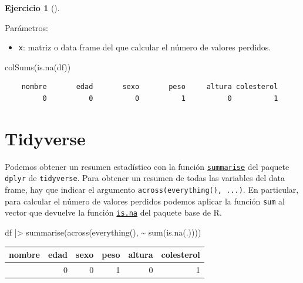 \documentclass[
  a4paper,
]{scrreport}
\newenvironment{Shaded}{\begin{snugshade}}{\end{snugshade}}
\newcommand{\FunctionTok}[1]{\textcolor[rgb]{0.28,0.35,0.67}{#1}}
\newcommand{\NormalTok}[1]{\textcolor[rgb]{0.00,0.23,0.31}{#1}}
\newcommand{\SpecialCharTok}[1]{\textcolor[rgb]{0.37,0.37,0.37}{#1}}
\providecommand{\tightlist}{%
  \setlength{\itemsep}{0pt}\setlength{\parskip}{0pt}}\usepackage{longtable,booktabs,array}
\theoremstyle{definition}
\newtheorem{exercise}{Ejercicio}[chapter]
\theoremstyle{remark}
\begin{document}
\begin{exercise}[]
\begin{enumerate}
\begin{tcolorbox}
  Parámetros:

  \begin{itemize}
  \tightlist
  \item
    \texttt{x}: matriz o data frame del que calcular el número de
    valores perdidos.
  \end{itemize}

\begin{Shaded}
\begin{Highlighting}[]
\FunctionTok{colSums}\NormalTok{(}\FunctionTok{is.na}\NormalTok{(df))}
\end{Highlighting}
\end{Shaded}

\begin{verbatim}
    nombre       edad       sexo       peso     altura colesterol 
         0          0          0          1          0          1 
\end{verbatim}

  \section{Tidyverse}

  Podemos obtener un resumen estadístico con la función
  \href{https://dplyr.tidyverse.org/reference/summarise.html}{\texttt{summarise}}
  del paquete \texttt{dplyr} de \texttt{tidyverse}. Para obtener un
  resumen de todas las variables del data frame, hay que indicar el
  argumento \texttt{across(everything(),\ ...)}. En particular, para
  calcular el número de valores perdidos podemos aplicar la función
  \texttt{sum} al vector que devuelve la función
  \href{https://www.rdocumentation.org/packages/base/versions/3.6.2/topics/is.na}{\texttt{is.na}}
  del paquete base de R.

\begin{Shaded}
\begin{Highlighting}[]
\NormalTok{df }\SpecialCharTok{|\textgreater{}} \FunctionTok{summarise}\NormalTok{(}\FunctionTok{across}\NormalTok{(}\FunctionTok{everything}\NormalTok{(), }\SpecialCharTok{\textasciitilde{}} \FunctionTok{sum}\NormalTok{(}\FunctionTok{is.na}\NormalTok{(.))))}
\end{Highlighting}
\end{Shaded}

  \begin{longtable}[]{@{}rrrrrr@{}}
  \toprule\noalign{}
  nombre & edad & sexo & peso & altura & colesterol \\
  \midrule\noalign{}
  \endhead
  \bottomrule\noalign{}
  \endlastfoot
  0 & 0 & 0 & 1 & 0 & 1 \\
  \end{longtable}


\end{tcolorbox}
\end{enumerate}
\end{exercise}
\end{document}
